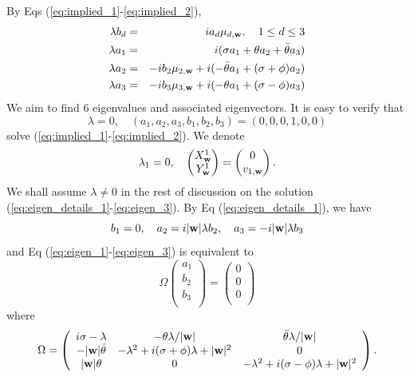 \documentclass[10pt,reqno]{amsart}
\renewcommand{\(}{\left(}
\renewcommand{\)}{\right)}
\newcommand{\bw}{{\bf w}}
\numberwithin{equation}{section}
\begin{document}
By Eqs (\ref{eq:implied_1}-\ref{eq:implied_2}), 
\begin{eqnarray}
	\lambda b_d &=& ia_d \mu_{d,\bw},  \quad 1\le d \le 3  \label{eq:eigen_details_1}\\
	\lambda a_1   &=& i (\sigma a_1 + \theta a_2 + \bar \theta a_3)   \label{eq:eigen_1}\\
	\lambda a_2   &=& -ib_2 \mu_{2,\bw}  + i (-\bar\theta a_1 + (\sigma + \phi) a_2 )   \label{eq:eigen_2}\\
	\lambda a_3   &=& -ib_3 \mu_{3,\bw}  + i (-\theta a_1 + (\sigma-\phi) a_3)   \label{eq:eigen_3}
\end{eqnarray}
We aim to find $6$ eigenvalues and associated eigenvectors. It is easy to verify that 
\[
\lambda = 0, \quad 	(a_1,a_2,a_3,b_1,b_2,b_3)=(0,0,0,1,0,0)
\]
solve (\ref{eq:implied_1}-\ref{eq:implied_2}). 
We denote 
\[
\lambda_1 = 0, \quad \begin{pmatrix}
	X^1_{\bw}  \\
	Y^1_{\bw} 
\end{pmatrix} = \begin{pmatrix}
	0  \\
	v_{1,\bw} 
\end{pmatrix}.
\]
We shall assume $\lambda\neq 0$ in the rest of discussion on the solution (\ref{eq:eigen_details_1}-\ref{eq:eigen_3}). By Eq (\ref{eq:eigen_details_1}), we have
\begin{equation}\label{eq:b1a2a3}
	b_1=0, \quad  a_2= i |\bw|\lambda b_2, \quad a_3= -i |\bw|\lambda b_3
\end{equation}
and Eq (\ref{eq:eigen_1}-\ref{eq:eigen_3}) is equivalent to
\begin{equation} \label{eq:Omega_a_b}
\Omega \left(
\begin{array}{c}
	a_1  \\
	b_2 \\
	b_3 \\
\end{array}
\right) = \left(
\begin{array}{c}
	0 \\
	0 \\
	0 \\
\end{array}
\right) 
\end{equation}
where
\[
\Omega = \left(
\begin{array}{ccc}
	i\sigma -\lambda &  -\theta\lambda/|\bw|  &  \bar\theta\lambda/|\bw| \\
	-|\bw| \bar\theta &  -\lambda^2+ i(\sigma+\phi)\lambda + |\bw|^2   & 0 \\
	|\bw| \theta & 0 & -\lambda^2+ i(\sigma-\phi)\lambda + |\bw|^2  \\
\end{array}
\right).
\]
\end{document}
